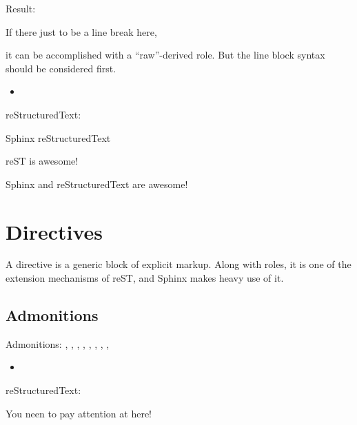 \documentclass[letterpaper,12pt,english]{sphinxmanual}
\begin{document}
Result:

If there just  to be a line break here,

it can be accomplished with a “raw”-derived role.
But the line block syntax should be considered first.
\begin{itemize}
\item {} 

\end{itemize}

reStructuredText:

\begin{sphinxVerbatim}[commandchars=\\\{\}]
   Sphinx
   reStructuredText

\textbar{}reST\textbar{} is awesome!
\end{sphinxVerbatim}

Sphinx and reStructuredText are awesome!


\section{Directives}
\label{\detokenize{rtxt:directives}}
A directive is a generic block of explicit markup. Along with roles, it is one of the extension mechanisms of reST, and Sphinx makes heavy use of it.


\subsection{Admonitions}
\label{\detokenize{rtxt:admonitions}}
Admonitions: , , , , , , , , 
\begin{itemize}
\item {} 

\end{itemize}

reStructuredText:

\begin{sphinxVerbatim}[commandchars=\\\{\}]
 

   You neen to pay attention at here!
\end{sphinxVerbatim}
\end{document}
